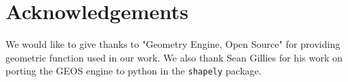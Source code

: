 \section{Acknowledgements}
We would like to give thanks to "Geometry Engine, Open Source"
for providing geometric function used in our work.
We also thank Sean Gillies for his work on porting the GEOS engine to python in the \texttt{shapely} package.
